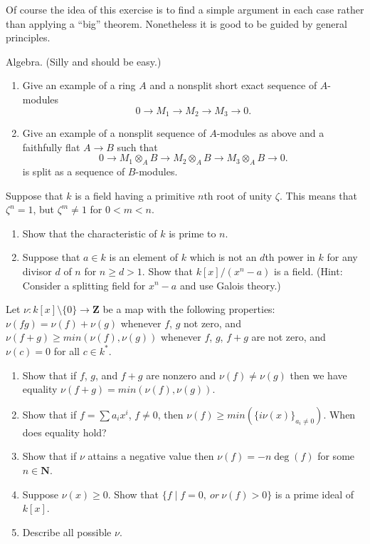 \begin{remark}
\label{remark-simple-geometric}
Of course the idea of this exercise is to find
a simple argument in each case rather than applying a ``big'' theorem.
Nonetheless it is good to be guided by general principles.
\end{remark}

\begin{exercise}
\label{exercise-silly}
Algebra. (Silly and should be easy.)
\begin{enumerate}
\item Give an example of a ring $A$ and a nonsplit
short exact sequence of $A$-modules
$$
0 \to M_1 \to M_2 \to M_3 \to 0.
$$
\item Give an example of a nonsplit sequence of $A$-modules
as above and a faithfully flat $A \to B$ such that
$$
0 \to M_1\otimes_A B \to M_2\otimes_A B \to M_3\otimes_A B \to 0.
$$
is split as a sequence of $B$-modules.
\end{enumerate}
\end{exercise}

\begin{exercise}
\label{exercise-field-kummer}
Suppose that $k$ is a field having a primitive $n$th root
of unity $\zeta$. This means that $\zeta^n = 1$, but $\zeta^m\not = 1$ for
$0<m<n$.
\begin{enumerate}
\item Show that the characteristic of $k$ is prime to $n$.
\item Suppose that $a \in k$ is an element of $k$ which is not
an $d$th power in $k$ for any divisor $d$ of $n$ for $n \geq d>1$. Show that
$k[x]/(x^n-a)$ is a field. (Hint: Consider a splitting field for
$x^n-a$ and use Galois theory.)
\end{enumerate}
\end{exercise}

\begin{exercise}
\label{exercise-valuation}
Let $\nu : k[x]\setminus \{0\}  \to {\mathbf Z}$ be a map
with the following properties: $\nu(fg) = \nu(f) + \nu(g)$ whenever
$f$, $g$ not zero, and  $\nu(f + g) \geq min(\nu(f), \nu(g))$ whenever
$f$, $g$, $f + g$ are not zero, and $\nu(c) = 0$ for all $c\in k^*$.
\begin{enumerate}
\item Show that if $f$, $g$, and $f + g$ are nonzero and
$\nu(f) \not = \nu(g)$ then we have equality $\nu(f + g) = min(\nu(f), \nu(g))$.
\item Show that if $f = \sum a_i x^i$, $f\not = 0$, then
$\nu(f) \geq min(\{i\nu(x)\}_{a_i\not = 0})$. When does equality hold?
\item Show that if $\nu$ attains a negative value then
$\nu(f) = -n \deg(f)$ for some $n\in {\mathbf N}$.
\item Suppose $\nu(x) \geq 0$. Show that
$\{f \mid f = 0, \ or\ \nu(f) > 0\}$ is a prime ideal of $k[x]$.
\item Describe all possible $\nu$.
\end{enumerate}
\end{exercise}


